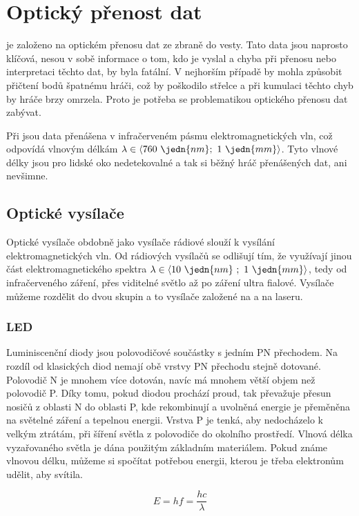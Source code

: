 \section{Optický přenost dat}
 je založeno na optickém přenosu dat ze zbraně do vesty. Tato data jsou naprosto klíčová, nesou v sobě informace o tom, kdo je vyslal a chyba při přenosu nebo interpretaci těchto dat, by byla fatální. V nejhorším případě by mohla způsobit přičtení bodů špatnému hráči, což by poškodilo střelce a při kumulaci těchto chyb by  hráče brzy omrzela. Proto je potřeba se problematikou optického přenosu dat zabývat.

Při  jsou data přenášena v infračerveném pásmu elektromagnetických vln, což odpovídá vlnovým délkám $\lambda \in \langle 760~\jedn{nm};~1~\jedn{mm}\rangle$. Tyto vlnové délky jsou pro lidské oko nedetekovalné a tak si běžný hráč přenášených dat, ani nevšimne.

\subsection{Optické vysílače}
Optické vysílače obdobně jako vysílače rádiové slouží k vysílání elektromagnetických vln. Od rádiových vysílačů  se odlišují tím, že využívají jinou část elektromagnetického spektra $\lambda \in \langle 10~\jedn{nm}~;~1~\jedn{mm}  \rangle$, tedy od infračerveného záření, přes viditelné světlo až po záření ultra fialové. Vysílače můžeme rozdělit do dvou skupin a to vysílače založené na  a na laseru.

\subsubsection{LED}
Luminiscenční diody jsou polovodičové součástky s jedním PN přechodem. Na rozdíl od klasických diod nemají  obě vrstvy PN přechodu stejně dotované. Polovodič N je mnohem více dotován, navíc má mnohem větší objem než polovodič P. Díky tomu, pokud diodou prochází proud, tak převažuje přesun nosičů z oblasti N do oblasti P, kde rekombinují a uvolněná energie je přeměněna na světelné záření a tepelnou energii. Vrstva P je tenká, aby nedocházelo k velkým ztrátám, při šíření světla z polovodiče do okolního prostředí. Vlnová délka vyzařovaného světla je dána použitým základním materiálem. Pokud známe vlnovou délku, můžeme si spočítat potřebou energii, kterou je třeba elektronům udělit, aby  svítila.

$$ E = hf = \dfrac{hc}{\lambda} $$

